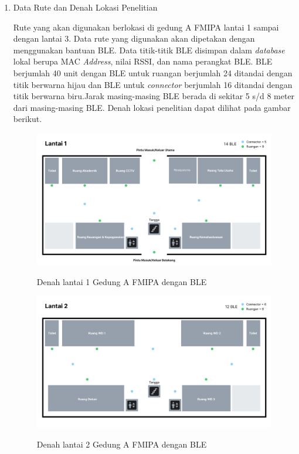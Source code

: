 \begin{enumerate}
	\newpage
	
	\item Data Rute dan Denah Lokasi Penelitian
	\par Rute yang akan digunakan berlokasi di gedung A FMIPA lantai 1 sampai dengan lantai 3. Data rute yang digunakan akan dipetakan dengan menggunakan bantuan BLE. Data titik-titik BLE disimpan dalam \textit{database} lokal berupa MAC \textit{Address}, nilai RSSI, dan nama perangkat BLE. BLE berjumlah 40 unit dengan BLE untuk ruangan berjumlah 24 ditandai dengan titik berwarna hijau dan BLE untuk \textit{connector} berjumlah 16 ditandai dengan titik berwarna biru.Jarak masing-masing BLE berada di sekitar 5 s/d 8 meter dari masing-masing BLE. Denah lokasi penelitian dapat dilihat pada gambar berikut.
	
	\begin{figure}[H]
\centering
{\includegraphics [scale = 0.2]{gambar/bab4/Denah-1-BLE}}
\caption{Denah lantai 1 Gedung A FMIPA dengan BLE}
\label{img:denah_1_ble}
\end{figure}

\begin{figure}[H]
\centering
{\includegraphics [scale = 0.2]{gambar/bab4/Denah-2-BLE}}
\caption{Denah lantai 2 Gedung A FMIPA dengan BLE}
\label{img:denah_2_ble}
\end{figure}


\end{enumerate}
